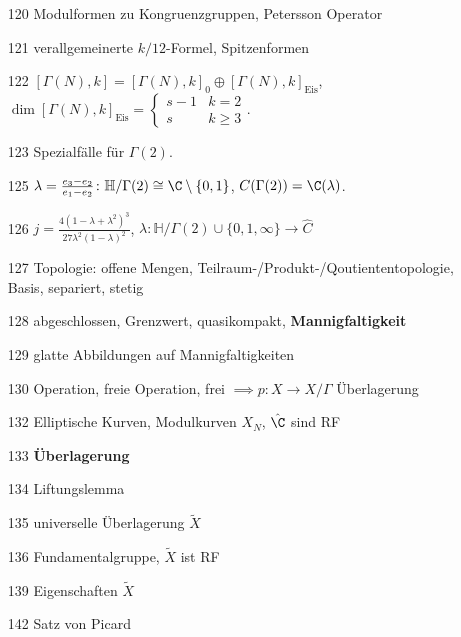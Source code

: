 \documentclass{article}
\begin{document}
\begin{itemize}
    \item[120] Modulformen zu Kongruenzgruppen, Petersson Operator
    \item[121] verallgemeinerte $k/12$-Formel, Spitzenformen
    \item[122] $[\Gamma(N), k] = [\Gamma(N), k]_0 \oplus [\Gamma(N), k]_{\mathrm{Eis}}$, $\operatorname{\dim}[\Gamma(N), k]_{\mathrm{Eis}} = \begin{cases}s-1 & k = 2 \\s &k \geq 3\end{cases}$.
    \item[123] Spezialfälle für $\Gamma(2)$.
    \item[125] $\lambda = \frac{e_3 - e_2}{e_1 - e_2}\colon \mathbb{H}/\Gamma(2) \cong \C\setminus\{0,1\}$, $C(\Gamma(2)) = \C(\lambda)$.
    \item[126] $j = \frac{4(1-\lambda + \lambda^2)^3}{27\lambda^2(1-\lambda)^2}$, $\lambda\colon \mathbb{H}/\Gamma(2) \cup \{0,1,\infty\} \to \hat C$  
\end{itemize}
\newpage
\begin{itemize}
    \item[127] Topologie: offene Mengen, Teilraum-/Produkt-/Qoutiententopologie, Basis, separiert, stetig
    \item[128] abgeschlossen, Grenzwert, quasikompakt, \textbf{Mannigfaltigkeit}
    \item[129] glatte Abbildungen auf Mannigfaltigkeiten
    \item[130] Operation, freie Operation, frei $ \implies p \colon X \to X/\Gamma$ Überlagerung
    \item[132] Elliptische Kurven, Modulkurven $X_N$, $\hat \C$ sind RF
    \item[133] \textbf{Überlagerung}
    \item[134] Liftungslemma
    \item[135] universelle Überlagerung $\tilde X$
    \item[136] Fundamentalgruppe, $\tilde X$ ist RF
    \item[139] Eigenschaften $\tilde X$ 
    \item[142] Satz von Picard 
\end{itemize}
\end{document}
